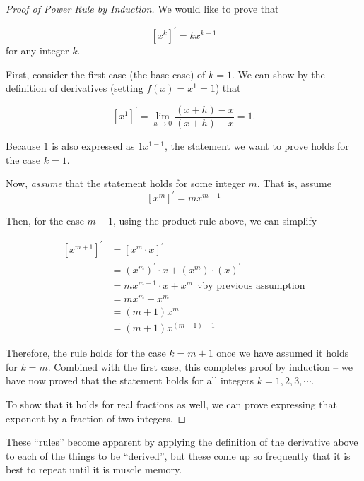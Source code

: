 \documentclass[
]{book}
\theoremstyle{definition}
\theoremstyle{definition}
\theoremstyle{definition}
\theoremstyle{definition}
\theoremstyle{remark}
\begin{document}
\begin{proof}[Proof of Power Rule by Induction]
{}
We would like to prove that

\[\left[x^k\right]^\prime = k x^{k-1}\]
for any integer \(k\).

First, consider the first case (the base case) of \(k = 1\). We can show by the definition of derivatives (setting \(f(x) = x^1 = 1\)) that

\[[x^1]^\prime = \lim_{h \rightarrow 0}\frac{(x + h) - x}{(x + h) - x}= 1.\]

Because \(1\) is also expressed as \(1 x^{1- 1}\), the statement we want to prove holds for the case \(k =1\).

Now, \emph{assume} that the statement holds for some integer \(m\). That is, assume
\[\left[x^m\right]^\prime = m x^{m-1}\]

Then, for the case \(m + 1\), using the product rule above, we can simplify

\begin{align*}
\left[x^{m + 1}\right]^\prime &= [x^{m}\cdot x]^\prime\\
&= (x^m)^\prime\cdot x + (x^m)\cdot (x)^\prime\\
&= m x^{m - 1}\cdot x + x^m ~~\because \text{by previous assumption}\\
&= mx^m + x^m\\
&= (m + 1)x^m\\
&= (m + 1)x^{(m + 1) - 1}
\end{align*}

Therefore, the rule holds for the case \(k = m + 1\) once we have assumed it holds for \(k = m\). Combined with the first case, this completes proof by induction -- we have now proved that the statement holds for all integers \(k = 1, 2, 3, \cdots\).

To show that it holds for real fractions as well, we can prove expressing that exponent by a fraction of two integers.
\end{proof}

These ``rules'' become apparent by applying the definition of the derivative above to each of the things to be ``derived'', but these come up so frequently that it is best to repeat until it is muscle memory.
\end{document}
